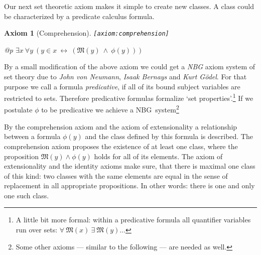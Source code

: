 \documentclass[a4paper,german,10pt,twoside]{book}
\newtheorem{ax}{Axiom}
\theoremstyle{definition}
\theoremstyle{remark}
\begin{document}
\par
Our next set theoretic axiom makes it simple to create new classes. A class could be characterized by a predicate calculus formula.

\begin{ax}[Comprehension]
\label{axiom:comprehension} \hypertarget{axiom:comprehension}{}
{\tt \tiny [\verb]axiom:comprehension]]}
\mbox{}
\begin{longtable}{{@{\extracolsep{\fill}}p{\linewidth}}}
\centering $\exists x\ \forall y\ (y \in x\ \leftrightarrow\ (\mathfrak{M}(y)\ \land\ \phi(y)))$
\end{longtable}

\end{ax}

By a small modification of the above axiom we could get a \emph{NBG} axiom system of set theory due to \emph{John von Neumann}, \emph{Isaak Bernays} and \emph{Kurt G{\"o}del}.
For that purpose we call a formula \emph{predicative}, if all of its bound subject variables are restricted to sets.
Therefore predicative formulas formalize `set properties'.\footnote{A little bit more formal: within a predicative formula all quantifier variables run over sets: $\forall \ \mathfrak{M}(x) \ \exists \ \mathfrak{M}(y) \ldots$}
If we postulate $\phi$ to be predicative we achieve a NBG~system\footnote{Some other axioms --- similar to the following --- are needed as well.}


\par
By the comprehension axiom and the axiom of extensionality a relationship between a formula $\phi(y)$ and the class defined by this formula is described. The comprehension axiom proposes the existence of at least one class, where the proposition $\mathfrak{M}(y) \land \phi(y)$ holds for all of its elements. The axiom of extensionality and the identity axioms make sure, that there is maximal one class of this kind: two classes with the same elements are equal in the sense of replacement in all appropriate propositions. In other words: there is one and only one such class.
\end{document}
